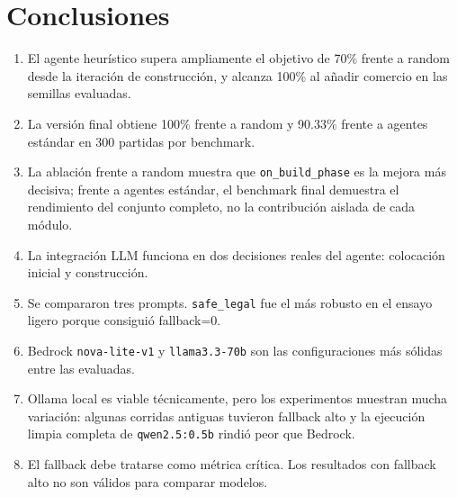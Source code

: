 ﻿\documentclass[10pt,a4paper]{article}
\begin{document}
\section{Conclusiones}
\begin{enumerate}
\item El agente heurístico supera ampliamente el objetivo de 70\% frente a random desde la iteración de construcción, y alcanza 100\% al añadir comercio en las semillas evaluadas.
\item La versión final obtiene 100\% frente a random y 90.33\% frente a agentes estándar en 300 partidas por benchmark.
\item La ablación frente a random muestra que \texttt{on\_build\_phase} es la mejora más decisiva; frente a agentes estándar, el benchmark final demuestra el rendimiento del conjunto completo, no la contribución aislada de cada módulo.
\item La integración LLM funciona en dos decisiones reales del agente: colocación inicial y construcción.
\item Se compararon tres prompts. \texttt{safe\_legal} fue el más robusto en el ensayo ligero porque consiguió fallback=0.
\item Bedrock \texttt{nova-lite-v1} y \texttt{llama3.3-70b} son las configuraciones más sólidas entre las evaluadas.
\item Ollama local es viable técnicamente, pero los experimentos muestran mucha variación: algunas corridas antiguas tuvieron fallback alto y la ejecución limpia completa de \texttt{qwen2.5:0.5b} rindió peor que Bedrock.
\item El fallback debe tratarse como métrica crítica. Los resultados con fallback alto no son válidos para comparar modelos.
\end{enumerate}
\end{document}
